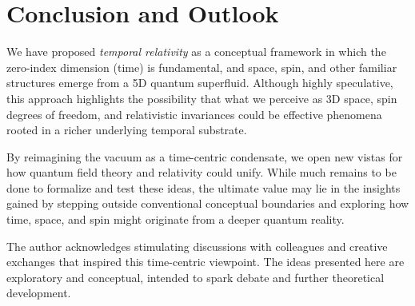 \documentclass[aps,prd,twocolumn,showpacs,showkeys,superscriptaddress,amsmath,amssymb]{revtex4-2}
\begin{document}
\section{Conclusion and Outlook}

We have proposed \emph{temporal relativity} as a conceptual framework in which the zero-index dimension (time) is fundamental, and space, spin, and other familiar structures emerge from a 5D quantum superfluid. Although highly speculative, this approach highlights the possibility that what we perceive as 3D space, spin degrees of freedom, and relativistic invariances could be effective phenomena rooted in a richer underlying temporal substrate.

By reimagining the vacuum as a time-centric condensate, we open new vistas for how quantum field theory and relativity could unify. While much remains to be done to formalize and test these ideas, the ultimate value may lie in the insights gained by stepping outside conventional conceptual boundaries and exploring how time, space, and spin might originate from a deeper quantum reality.

\begin{acknowledgments}
The author acknowledges stimulating discussions with colleagues and creative exchanges that inspired this time-centric viewpoint. The ideas presented here are exploratory and conceptual, intended to spark debate and further theoretical development.
\end{acknowledgments}
\end{document}
